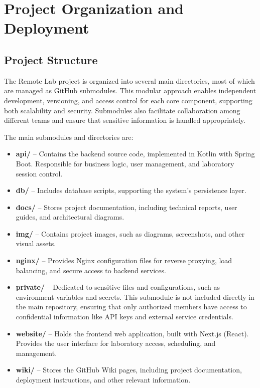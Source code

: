 \chapter{Project Organization and Deployment} \label{cap:project_org_deployment}

\section{Project Structure}

The Remote Lab project is organized into several main directories, most of which are managed as GitHub submodules. This modular approach enables independent development, versioning, and access control for each core component, supporting both scalability and security. Submodules also facilitate collaboration among different teams and ensure that sensitive information is handled appropriately.

The main submodules and directories are:

\begin{itemize}
    \item \textbf{api/} – Contains the backend source code, implemented in Kotlin with Spring Boot. Responsible for business logic, user management, and laboratory session control.
    \item \textbf{db/} – Includes database scripts, supporting the system's persistence layer.
    \item \textbf{docs/} – Stores project documentation, including technical reports, user guides, and architectural diagrams.
    \item \textbf{img/} – Contains project images, such as diagrams, screenshots, and other visual assets.
    \item \textbf{nginx/} – Provides Nginx configuration files for reverse proxying, load balancing, and secure access to backend services.
    \item \textbf{private/} – Dedicated to sensitive files and configurations, such as environment variables and secrets. This submodule is not included directly in the main repository, ensuring that only authorized members have access to confidential information like API keys and external service credentials.
    \item \textbf{website/} – Holds the frontend web application, built with Next.js (React). Provides the user interface for laboratory access, scheduling, and management.
    \item \textbf{wiki/} – Stores the GitHub Wiki pages, including project documentation, deployment instructions, and other relevant information.
\end{itemize}

